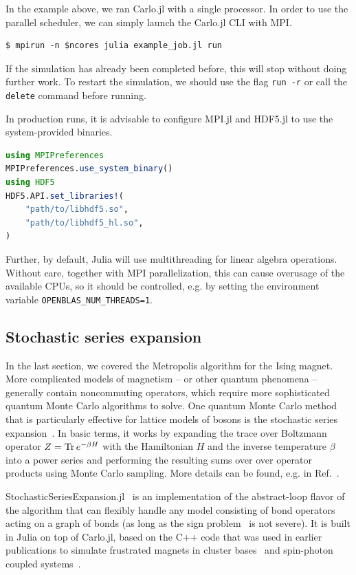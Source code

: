 \documentclass{SciPost}
\begin{document}
In the example above, we ran Carlo.jl with a single processor. In order to use the parallel scheduler, we can simply launch the Carlo.jl CLI with MPI.
\begin{lstlisting}
$ mpirun -n $ncores julia example_job.jl run
\end{lstlisting}
If the simulation has already been completed before, this will stop without doing further work. To restart the simulation, we should use the flag \texttt{run -r} or call the \texttt{delete} command before running.

In production runs, it is advisable to configure MPI.jl and HDF5.jl to use the system-provided binaries.
\begin{lstlisting}[language=julia]
using MPIPreferences
MPIPreferences.use_system_binary()
using HDF5
HDF5.API.set_libraries!(
    "path/to/libhdf5.so",
    "path/to/libhdf5_hl.so",
)
\end{lstlisting}
Further, by default, Julia will use multithreading for linear algebra operations. Without care, together with MPI parallelization, this can cause overusage of the available CPUs, so 
it should be controlled, e.g. by setting the environment variable \texttt{OPENBLAS\_{}NUM\_{}THREADS=1}.
\subsection{Stochastic series expansion}
\label{sec:sse}
In the last section, we covered the Metropolis algorithm for the Ising magnet. More complicated models of magnetism -- or other quantum phenomena -- generally contain noncommuting operators, which require more sophisticated quantum Monte Carlo algorithms to solve. One quantum Monte Carlo method that is particularly effective for lattice models of bosons is the stochastic series expansion~\cite{Sandvik1999}. In basic terms, it works by expanding the trace over Boltzmann operator $Z=\Tr e^{-\beta H}$ with the Hamiltonian $H$ and the inverse temperature $\beta$ into a power series and performing the resulting sums over over operator products using Monte Carlo sampling. More details can be found, e.g. in Ref.~\cite{Sandvik2010}.

StochasticSeriesExpansion.jl~\cite{WeberStochasticSeriesExpansion2024} is an implementation of the abstract-loop flavor\cite{Weber2022} of the algorithm that can flexibly handle any model consisting of bond operators acting on a graph of bonds (as long as the sign problem~\cite{Pan2024} is not severe). It is built in Julia on top of Carlo.jl, based on the C++ code that was used in earlier publications to simulate frustrated magnets in cluster bases~\cite{Jimenez2021,WeberCluster2022,WeberThermal2022} and spin-photon coupled systems~\cite{weber_cavityrenormalized_2023}.
\end{document}
